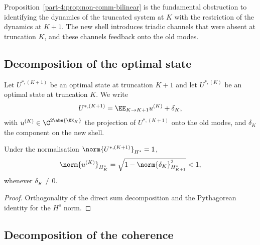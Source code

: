 \begin{remark}\label{part-4:rem:obstruction}
Proposition~\ref{part-4:prop:non-comm-bilinear} is the fundamental 
obstruction to identifying the dynamics of the truncated system at 
$K$ with the restriction of the dynamics at $K+1$. The new shell 
introduces triadic channels that were absent at truncation $K$, and 
these channels feedback onto the old modes.
\end{remark}

\subsection{Decomposition of the optimal state}
\label{part-4:ssec:decomposition}

Let $U^{\ast,(K+1)}$ be an optimal state at truncation $K+1$ and let 
$U^{\ast,(K)}$ be an optimal state at truncation $K$. We write
\begin{equation}\label{part-4:eq:decomposition}
U^{\ast,(K+1)} = \EE_{K\to K+1}u^{(K)} + \delta_K,
\end{equation}
with $u^{(K)}\in\C^{2\abs{\KK_K}}$ the projection of $U^{\ast,(K+1)}$ 
onto the old modes, and $\delta_K$ the component on the new shell.

\begin{proposition}\label{part-4:prop:norm-loss}
Under the normalisation $\norm{U^{\ast,(K+1)}}_{H^s}=1$,
\begin{equation}\label{part-4:eq:norm-loss}
\norm{u^{(K)}}_{H^s_K} = \sqrt{1 - \norm{\delta_K}_{H^s_{K+1}}^2} < 1,
\end{equation}
whenever $\delta_K\neq 0$.
\end{proposition}

\begin{proof}
Orthogonality of the direct sum decomposition and the Pythagorean 
identity for the $H^s$ norm.
\end{proof}

\subsection{Decomposition of the coherence}
\label{part-4:ssec:coherence-decomposition}

